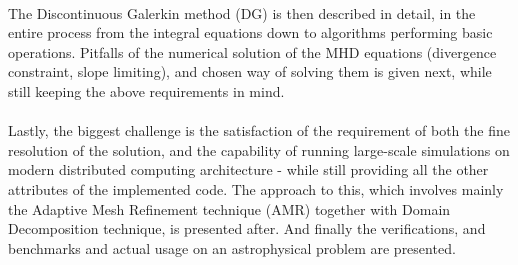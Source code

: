 \paragraph{}
The Discontinuous Galerkin method (DG) is then described in detail, in the entire process from the integral equations down to algorithms performing basic operations. Pitfalls of the numerical solution of the MHD equations (divergence constraint, slope limiting), and chosen way of solving them is given next, while still keeping the above requirements in mind.
\paragraph{}
Lastly, the biggest challenge is the satisfaction of the requirement of both the fine resolution of the solution, and the capability of running large-scale simulations on modern distributed computing architecture - while still providing all the other attributes of the implemented code. The approach to this, which involves mainly the Adaptive Mesh Refinement technique (AMR) together with Domain Decomposition technique, is presented after. And finally the verifications, and benchmarks and actual usage on an astrophysical problem are presented.
